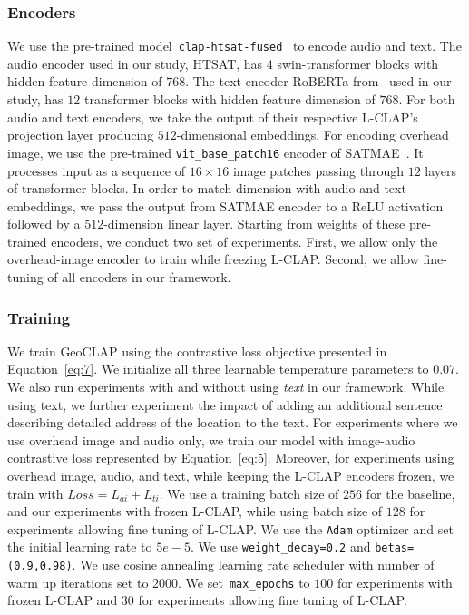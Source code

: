 \documentclass{bmvc2k}
\begin{document}
\subsubsection{Encoders}
We use the pre-trained model~\texttt{clap-htsat-fused}~\cite{laionclap2023} to encode audio and text. The audio encoder used in our study, HTSAT, has $4$ swin-transformer blocks with hidden feature dimension of $768$. The text encoder RoBERTa from~\cite{laionclap2023} used in our study, has $12$ transformer blocks with hidden feature dimension of $768$. For both audio and text encoders, we take the output of their respective L-CLAP's projection layer producing $512$-dimensional embeddings.
For encoding overhead image, we use the pre-trained \texttt{vit\_base\_patch16} encoder of SATMAE~\cite{cong2022satmae}. It processes input as a sequence of $16\times16$ image patches passing through $12$ layers of transformer blocks. In order to match dimension with audio and text embeddings, we pass the output from SATMAE encoder to a ReLU activation followed by a $512$-dimension linear layer.
Starting from weights of these pre-trained encoders, we conduct two set of experiments. First, we allow only the overhead-image encoder to train while freezing L-CLAP. Second, we allow fine-tuning of all encoders in our framework. 

\subsubsection{Training}
We train GeoCLAP using the contrastive loss objective presented in Equation~\ref{eq:7}. We initialize all three learnable temperature parameters to $0.07$. We also run experiments with and without using \textit{text} in our framework. While using text, we further experiment the impact of adding an additional sentence describing detailed address of the location to the text. For experiments where we use overhead image and audio only, we train our model with image-audio contrastive loss represented by Equation~\ref{eq:5}. Moreover, for experiments using overhead image, audio, and text, while keeping the L-CLAP encoders frozen, we train with $Loss = L_{ai} + L_{ti}$. We use a training batch size of $256$ for the baseline, and our experiments with frozen L-CLAP, while using batch size of $128$ for experiments allowing fine tuning of L-CLAP. We use the \texttt{Adam} optimizer and set the initial learning rate to $5e-5$. We use \texttt{weight\_decay=0.2} and \texttt{betas=(0.9,0.98)}. We use cosine annealing learning rate scheduler with number of warm up iterations set to $2000$. We set~\texttt{max\_epochs} to $100$ for experiments with frozen L-CLAP and $30$ for experiments allowing fine tuning of L-CLAP. 
\end{document}
